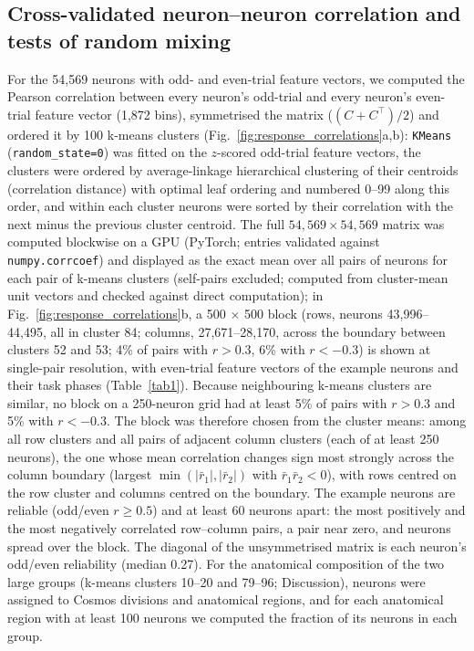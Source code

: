 \documentclass[10pt,lineno]{elife}
\begin{document}
\subsection{Cross-validated neuron--neuron correlation and tests of random mixing}
For the 54,569 neurons with odd- and even-trial feature vectors, we computed the Pearson correlation between every neuron's odd-trial and every neuron's even-trial feature vector (1,872 bins), symmetrised the matrix ($(C+C^\top)/2$) and ordered it by 100 k-means clusters (Fig.~\ref{fig:response_correlations}a,b): \texttt{KMeans} (\texttt{random\_state=0}) was fitted on the $z$-scored odd-trial feature vectors, the clusters were ordered by average-linkage hierarchical clustering of their centroids (correlation distance) with optimal leaf ordering and numbered 0--99 along this order, and within each cluster neurons were sorted by their correlation with the next minus the previous cluster centroid. The full $54{,}569\times54{,}569$ matrix was computed blockwise on a GPU (PyTorch; entries validated against \texttt{numpy.corrcoef}) and displayed as the exact mean over all pairs of neurons for each pair of k-means clusters (self-pairs excluded; computed from cluster-mean unit vectors and checked against direct computation); in Fig.~\ref{fig:response_correlations}b, a 500 $\times$ 500 block (rows, neurons 43,996--44,495, all in cluster 84; columns, 27,671--28,170, across the boundary between clusters 52 and 53; 4\% of pairs with $r>0.3$, 6\% with $r<-0.3$) is shown at single-pair resolution, with even-trial feature vectors of the example neurons and their task phases (Table~\ref{tab1}). Because neighbouring k-means clusters are similar, no block on a 250-neuron grid had at least 5\% of pairs with $r>0.3$ and 5\% with $r<-0.3$. The block was therefore chosen from the cluster means: among all row clusters and all pairs of adjacent column clusters (each of at least 250 neurons), the one whose mean correlation changes sign most strongly across the column boundary (largest $\min(|\bar r_1|,|\bar r_2|)$ with $\bar r_1\bar r_2<0$), with rows centred on the row cluster and columns centred on the boundary. The example neurons are reliable (odd/even $r\geq0.5$) and at least 60 neurons apart: the most positively and the most negatively correlated row--column pairs, a pair near zero, and neurons spread over the block. The diagonal of the unsymmetrised matrix is each neuron's odd/even reliability (median 0.27). For the anatomical composition of the two large groups (k-means clusters 10--20 and 79--96; Discussion), neurons were assigned to Cosmos divisions and anatomical regions, and for each anatomical region with at least 100 neurons we computed the fraction of its neurons in each group.
\end{document}
